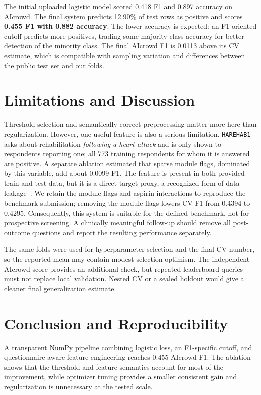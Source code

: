 \documentclass[10pt,conference,compsocconf]{IEEEtran}
\begin{document}
The initial uploaded logistic model scored 0.418 F1 and 0.897 accuracy on
AIcrowd.  The final system predicts 12.90\% of test rows as positive and scores
\textbf{0.455 F1 with 0.882 accuracy}.  The lower accuracy is expected: an
F1-oriented cutoff predicts more positives, trading some majority-class
accuracy for better detection of the minority class.  The final AIcrowd F1 is
0.0113 above its CV estimate, which is compatible with sampling variation and
differences between the public test set and our folds.

\section{Limitations and Discussion}

Threshold selection and semantically correct preprocessing matter more here
than regularization.  However, one useful feature is also a serious limitation.
\texttt{HAREHAB1} asks about rehabilitation \emph{following a heart attack} and
is only shown to respondents reporting one; all 773 training respondents for
whom it is answered are positive.  A separate ablation estimated that sparse
module flags, dominated by this variable, add about 0.0099 F1.  The feature is
present in both provided train and test data, but it is a direct target proxy,
a recognized form of data leakage~\cite{kaufman2012leakage}.  We retain the
module flags and aspirin interactions to reproduce the benchmark submission;
removing the module flags lowers CV F1 from 0.4394 to 0.4295.  Consequently,
this system is suitable for the defined benchmark, not for prospective
screening.  A clinically meaningful
follow-up should remove all post-outcome questions and report the resulting
performance separately.

The same folds were used for hyperparameter selection and the final CV number,
so the reported mean may contain modest selection optimism.  The independent
AIcrowd score provides an additional check, but repeated leaderboard queries
must not replace local validation.  Nested CV or a sealed holdout would give a
cleaner final generalization estimate.

\section{Conclusion and Reproducibility}

A transparent NumPy pipeline combining logistic loss, an F1-specific cutoff,
and questionnaire-aware feature engineering reaches 0.455 AIcrowd F1.  The
ablation shows that the threshold and feature semantics account for most of
the improvement, while optimizer tuning provides a smaller consistent gain
and regularization is unnecessary at the tested scale.
\end{document}

